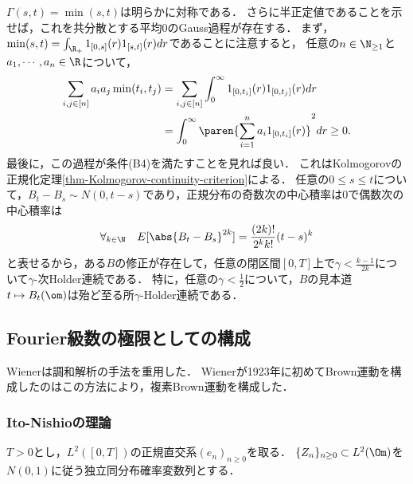 \documentclass[uplatex,dvipdfmx]{jsreport}
\begin{document}
\begin{construction}\label{construction-Kolmogorov}
    $\Gamma(s,t)=\min(s,t)$は明らかに対称である．
    さらに半正定値であることを示せば，これを共分散とする平均$0$のGauss過程が存在する．
    まず，$\min(s,t)=\int_{\R_+}1_{[0,s]}(r)1_{[s,t]}(r)dr$であることに注意すると，
    任意の$n\in\N_{\ge1}$と$a_1,\cdots,a_n\in\R$について，
    \begin{align*}
        \sum_{i,j\in[n]}a_ia_j\min(t_i,t_j)&=\sum_{i,j\in[n]}\int^\infty_01_{[0,t_i]}(r)1_{[0,t_j]}(r)dr\\
        &=\int^\infty_0\paren{\sum_{i=1}^na_i1_{[0,t_i]}(r)}^2dr\ge0.
    \end{align*}
    最後に，この過程が条件(B4)を満たすことを見れば良い．
    これはKolmogorovの正規化定理\ref{thm-Kolmogorov-continuity-criterion}による．
    任意の$0\le s\le  t$について，$B_t-B_s\sim N(0,t-s)$であり，正規分布の奇数次の中心積率は$0$で偶数次の中心積率は
    \[\forall_{k\in\N}\quad E[\abs{B_t-B_s}^{2k}]=\frac{(2k)!}{2^kk!}(t-s)^k\]
    と表せるから，ある$B$の修正が存在して，任意の閉区間$[0,T]$上で$\gamma<\frac{k-1}{2k}$について$\gamma$-次Holder連続である．
    特に，任意の$\gamma<\frac{1}{2}$について，$B$の見本道$t\mapsto B_t(\om)$は殆ど至る所$\gamma$-Holder連続である．
\end{construction}

\subsection{Fourier級数の極限としての構成}

\begin{tcolorbox}[colframe=ForestGreen, colback=ForestGreen!10!white,breakable,colbacktitle=ForestGreen!40!white,coltitle=black,fonttitle=\bfseries\sffamily,
title=]
    Wienerは調和解析の手法を重用した．
    Wienerが1923年に初めてBrown運動を構成したのはこの方法により，複素Brown運動を構成した．
\end{tcolorbox}

\subsubsection{Ito-Nishioの理論}

\begin{notation}
    $T>0$とし，$L^2([0,T])$の正規直交系$(e_n)_{n\ge0}$を取る．
    $\{Z_n\}_{n\ge0}\subset L^2(\Om)$を$N(0,1)$に従う独立同分布確率変数列とする．
\end{notation}
\end{document}
